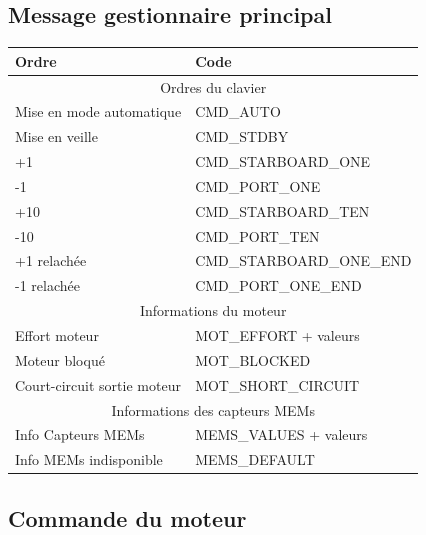 \documentclass[a4paper,11pt]{report}
\begin{document}
\subsection{Message gestionnaire principal}
\begin{tabular}{|l|l|}
\hline 
Ordre & Code  \\ 
\hline
\multicolumn{2}{|c|}{Ordres du clavier} \\
\hline 
Mise en mode automatique & CMD\_AUTO \\ 
Mise en veille & CMD\_STDBY \\ 
+1 & CMD\_STARBOARD\_ONE \\ 
-1 & CMD\_PORT\_ONE \\ 
+10 & CMD\_STARBOARD\_TEN \\ 
-10 & CMD\_PORT\_TEN \\ 
+1 relachée & CMD\_STARBOARD\_ONE\_END \\ 
-1 relachée & CMD\_PORT\_ONE\_END \\ 
\hline 
\multicolumn{2}{|c|}{Informations du moteur} \\
\hline
Effort moteur & MOT\_EFFORT + valeurs\\ 
Moteur bloqué & MOT\_BLOCKED \\
Court-circuit sortie moteur & MOT\_SHORT\_CIRCUIT \\
\hline
\multicolumn{2}{|c|}{Informations des capteurs MEMs}\\
\hline
Info Capteurs MEMs & MEMS\_VALUES + valeurs \\
Info MEMs indisponible & MEMS\_DEFAULT \\

\hline
\end{tabular} 
\subsection{Commande du moteur}
\end{document}

